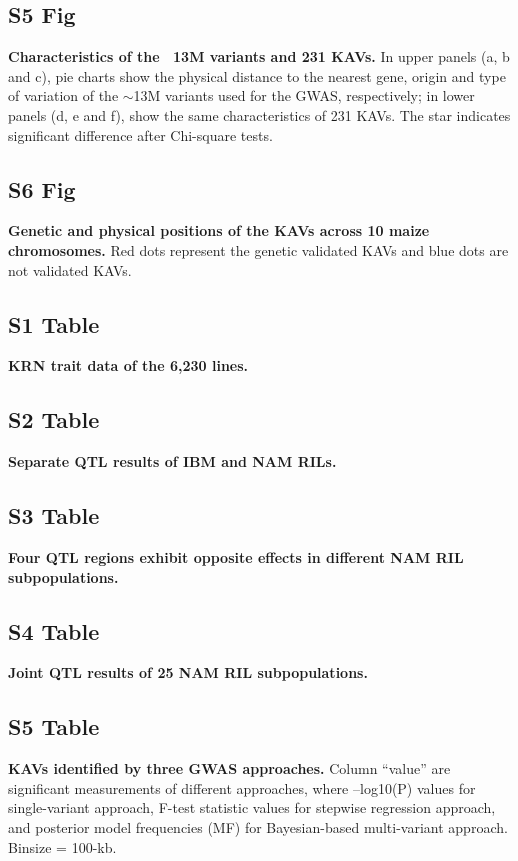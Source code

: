 \documentclass[10pt,letterpaper]{article}
\begin{document}
\subsection*{S5 Fig}
\label{Fig_S5}
{\bf Characteristics of the ~13M variants and 231 KAVs. } In upper panels (a, b and c), pie charts show the physical distance to the nearest gene, origin and type of variation of the $\sim$13M variants used for the GWAS, respectively; in lower panels (d, e and f), show the same characteristics of 231 KAVs. The star indicates significant difference after Chi-square tests.

\subsection*{S6 Fig}
\label{Fig_S6}
{\bf Genetic and physical positions of the KAVs across 10 maize chromosomes.} Red dots represent the genetic validated KAVs and blue dots are not validated KAVs.

\subsection*{S1 Table}
\label{Table_S1}
{\bf KRN trait data of the 6,230 lines.}

\subsection*{S2 Table}
\label{Table_S2}
{\bf Separate QTL results of IBM and NAM RILs.}

\subsection*{S3 Table}
\label{Table_S3}
{\bf Four QTL regions exhibit opposite effects in different NAM RIL subpopulations.}

\subsection*{S4 Table}
\label{Table_S4}
{\bf Joint QTL results of 25 NAM RIL subpopulations.}

\subsection*{S5 Table}
\label{Table_S5}
{\bf KAVs identified by three GWAS approaches.} Column “value” are significant measurements of different approaches, where –log10(P) values for single-variant approach, F-test statistic values for stepwise regression approach, and posterior model frequencies (MF) for Bayesian-based multi-variant approach. Binsize  = 100-kb.
\end{document}
